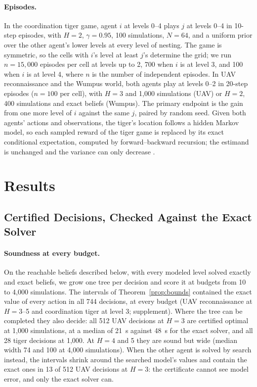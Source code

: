 \documentclass{article}
\begin{document}
\paragraph{Episodes.} In the coordination tiger game, agent $i$ at levels 0--4 plays $j$ at levels 0--4 in 10-step episodes, with $H = 2$, $\gamma = 0.95$, 100 simulations, $N = 64$, and a uniform prior over the other agent's lower levels at every level of nesting. The game is symmetric, so the cells with $i$'s level at least $j$'s determine the grid; we run $n = 15{,}000$ episodes per cell at levels up to 2, 700 when $i$ is at level 3, and 100 when $i$ is at level 4, where $n$ is the number of independent episodes. In UAV reconnaissance and the Wumpus world, both agents play at levels 0--2 in 20-step episodes ($n = 100$ per cell), with $H = 3$ and 1{,}000 simulations (UAV) or $H = 2$, 400 simulations and exact beliefs (Wumpus). The primary endpoint is the gain from one more level of $i$ against the same $j$, paired by random seed. Given both agents' actions and observations, the tiger's location follows a hidden Markov model, so each sampled reward of the tiger game is replaced by its exact conditional expectation, computed by forward--backward recursion; the estimand is unchanged and the variance can only decrease \cite{casella1996rao}.

\section{Results}
\label{sec:results}

\subsection{Certified Decisions, Checked Against the Exact Solver}
\label{sec:compute}

\paragraph{Soundness at every budget.} On the reachable beliefs described below, with every modeled level solved exactly and exact beliefs, we grow one tree per decision and score it at budgets from 10 to 4{,}000 simulations. The intervals of Theorem~\ref{prop:bounds} contained the exact value of every action in all 744 decisions, at every budget (UAV reconnaissance at $H = 3$--5 and coordination tiger at level 3; supplement). Where the tree can be completed they also decide: all 512 UAV decisions at $H = 3$ are certified optimal at 1{,}000 simulations, at a median of 21~s against 48~s for the exact solver, and all 28 tiger decisions at 1{,}000. At $H = 4$ and 5 they are sound but wide (median width 74 and 100 at 4{,}000 simulations). When the other agent is solved by search instead, the intervals shrink around the searched model's values and contain the exact ones in 13 of 512 UAV decisions at $H = 3$: the certificate cannot see model error, and only the exact solver can.
\end{document}
